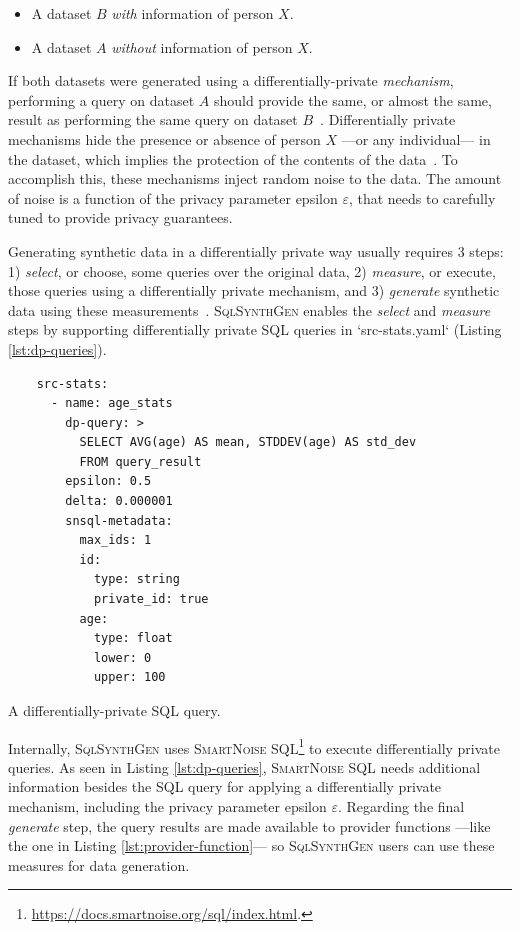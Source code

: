 \documentclass[11pt]{article}
\begin{document}
\begin{itemize}
    \item A dataset $B$ \emph{with} information of person $X$.
    \item A dataset $A$ \emph{without} information of person $X$.
\end{itemize}

If both datasets were generated using a differentially-private \emph{mechanism}, performing a query on dataset $A$ should provide the same, or almost the same, result as performing the same query on dataset $B$~\cite{Kopp2021MicrosoftSD}.
Differentially private mechanisms hide the presence or absence of person $X$ ---or any individual--- in the dataset, which implies the protection of the contents of the data~\cite{near2021}.
To accomplish this, these mechanisms inject random noise to the data.
The amount of noise is a function of the privacy parameter epsilon $\varepsilon$, that needs to
carefully tuned to provide privacy guarantees.

Generating synthetic data in a differentially private way usually requires 3 steps: 1) \emph{select}, or choose, some queries over the original data, 2) \emph{measure}, or execute, those queries using a differentially private mechanism, and 3) \emph{generate} synthetic data using these measurements~\cite{DBLP:journals/pvldb/McKennaMSM22}.
\textsc{SqlSynthGen} enables the \emph{select} and \emph{measure} steps by supporting differentially private SQL queries in `src-stats.yaml`  (Listing \ref{lst:dp-queries}).

\begin{listing}[H]
\begin{verbatim}
    src-stats:
      - name: age_stats
        dp-query: >
          SELECT AVG(age) AS mean, STDDEV(age) AS std_dev
          FROM query_result
        epsilon: 0.5
        delta: 0.000001
        snsql-metadata:
          max_ids: 1
          id:
            type: string
            private_id: true
          age:
            type: float
            lower: 0
            upper: 100
\end{verbatim}
\caption{A differentially-private SQL query. }
\label{lst:dp-queries}
\end{listing}

Internally, \textsc{SqlSynthGen} uses \textsc{SmartNoise SQL}\footnote{\url{https://docs.smartnoise.org/sql/index.html}.} to execute differentially private queries.
As seen in Listing \ref{lst:dp-queries}, \textsc{SmartNoise SQL} needs additional information besides the SQL query for applying a differentially private mechanism, including the privacy parameter epsilon $\varepsilon$.
Regarding the final \emph{generate} step, the query results are made available to provider functions ---like the one in Listing \ref{lst:provider-function}--- so \textsc{SqlSynthGen} users can use these measures for data generation. 
\end{document}
